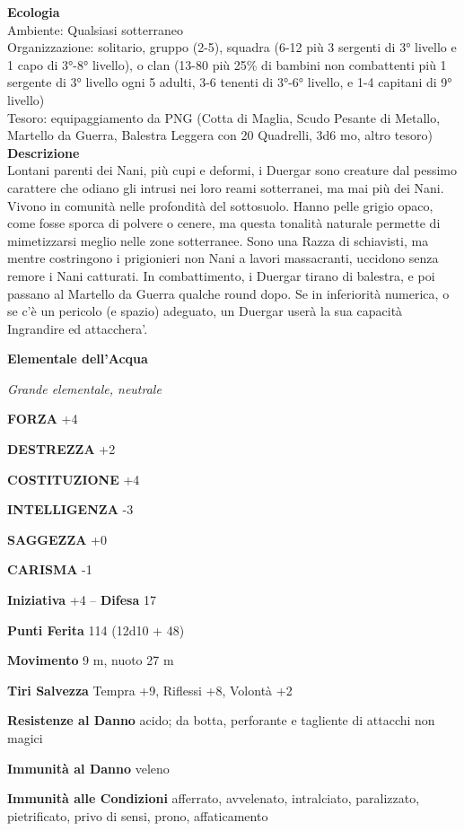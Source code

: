 \begin{multicols}{2}
\textbf{Ecologia}\\
Ambiente: Qualsiasi sotterraneo\\
Organizzazione: solitario, gruppo (2-5), squadra (6-12 più 3 sergenti di 3° livello e 1 capo di 3°-8° livello), o clan (13-80 più 25\% di bambini non combattenti più 1 sergente di 3° livello ogni 5 adulti, 3-6 tenenti di 3°-6° livello, e 1-4 capitani di 9° livello)\\
Tesoro: equipaggiamento da PNG (Cotta di Maglia, Scudo Pesante di Metallo, Martello da Guerra, Balestra Leggera con 20 Quadrelli, 3d6 mo, altro tesoro)\\
\textbf{Descrizione}\\
Lontani parenti dei Nani, più cupi e deformi, i Duergar sono creature dal pessimo carattere che odiano gli intrusi nei loro reami sotterranei, ma mai più dei Nani. Vivono in comunità nelle profondità del sottosuolo. Hanno pelle grigio opaco, come fosse sporca di polvere o cenere, ma questa tonalità naturale permette di mimetizzarsi meglio nelle zone sotterranee. Sono una Razza di schiavisti, ma mentre costringono i prigionieri non Nani a lavori massacranti, uccidono senza remore i Nani catturati. In combattimento, i Duergar tirano di balestra, e poi passano al Martello da Guerra qualche round dopo. Se in inferiorità numerica, o se c'è un pericolo (e spazio) adeguato, un Duergar userà la sua capacità Ingrandire ed attacchera'.

\medskip{}\textbf{Elementale dell'Acqua}

\emph{Grande elementale, neutrale}

\textbf{FORZA} +4

\textbf{DESTREZZA} +2

\textbf{COSTITUZIONE} +4

\textbf{INTELLIGENZA} -3

\textbf{SAGGEZZA} +0

\textbf{CARISMA} -1

\textbf{Iniziativa} +4 -- \textbf{Difesa} 17

\textbf{Punti Ferita} 114 (12d10 + 48)

\textbf{Movimento} 9 m, nuoto 27 m

\textbf{Tiri Salvezza} Tempra +9, Riflessi +8, Volontà +2

\textbf{Resistenze al Danno} acido; da botta, perforante e tagliente di attacchi non magici

\textbf{Immunità al Danno} veleno

\textbf{Immunità alle Condizioni} afferrato, avvelenato, intralciato, paralizzato, pietrificato, privo di sensi, prono, affaticamento


\end{multicols}
